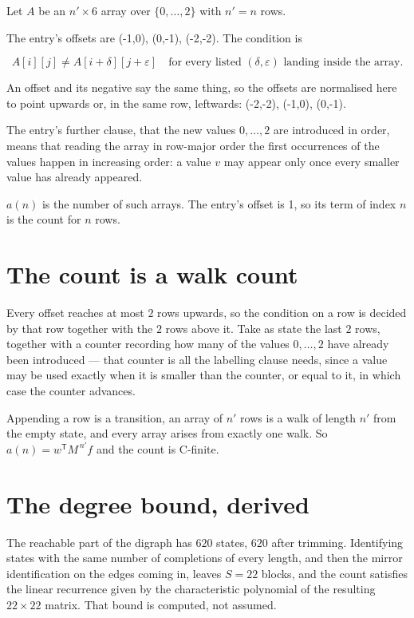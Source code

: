 \documentclass[11pt]{article}
\theoremstyle{definition}
\begin{document}
Let $A$ be an $n' \times 6$ array over $\{0,\dots,2\}$ with $n' = n$ rows.

The entry's offsets are (-1,0), (0,-1), (-2,-2). The condition is

\[A[i][j] \ne A[i{+}\delta][j{+}\varepsilon]\quad\text{for every listed }(\delta,\varepsilon)\text{ landing inside the array.}\]

An offset and its negative say the same thing, so the offsets are normalised here to point upwards or, in the same row, leftwards: (-2,-2), (-1,0), (0,-1).

The entry's further clause, that the new values $0,\dots,2$ are introduced in order, means that reading the array in row-major order the first occurrences of the values happen in increasing order: a value $v$ may appear only once every smaller value has already appeared.

$a(n)$ is the number of such arrays. The entry's offset is 1, so its term of index $n$ is the count for $n$ rows.

\section{The count is a walk count}

Every offset reaches at most $2$ rows upwards, so the condition on a row is decided by that row together with the $2$ rows above it. Take as state the last $2$ rows, together with a counter recording how many of the values $0,\dots,2$ have already been introduced --- that counter is all the labelling clause needs, since a value may be used exactly when it is smaller than the counter, or equal to it, in which case the counter advances.

Appending a row is a transition, an array of $n'$ rows is a walk of length $n'$ from the empty state, and every array arises from exactly one walk. So $a(n) = w^{\mathsf T}M^{\,n'}f$ and the count is C-finite.

\section{The degree bound, derived}

The reachable part of the digraph has $620$ states, $620$ after trimming. Identifying states with the same number of completions of every length, and then the mirror identification on the edges coming in, leaves $S = 22$ blocks, and the count satisfies the linear recurrence given by the characteristic polynomial of the resulting $22\times22$ matrix. That bound is computed, not assumed.
\end{document}
